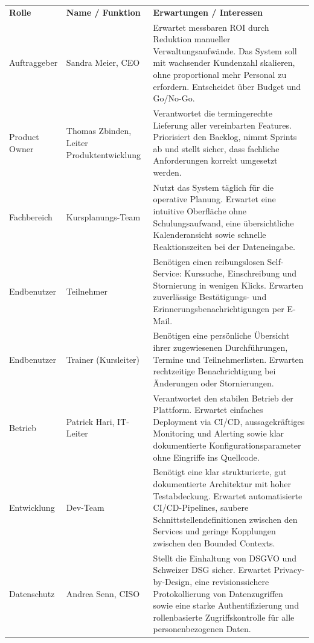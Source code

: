 \begin{tabularx}{\textwidth}{L{2.2cm} L{3.5cm} X}
  \color{white}\textbf{Rolle} & \color{white}\textbf{Name / Funktion} & \color{white}\textbf{Erwartungen / Interessen} \\
  Auftraggeber & Sandra Meier, CEO &
  Erwartet messbaren ROI durch Reduktion manueller Verwaltungsaufwände.
  Das System soll mit wachsender Kundenzahl skalieren, ohne proportional
  mehr Personal zu erfordern. Entscheidet über Budget und Go/No-Go. \\
  Product Owner & Thomas Zbinden, Leiter Produktentwicklung &
  Verantwortet die termingerechte Lieferung aller vereinbarten Features.
  Priorisiert den Backlog, nimmt Sprints ab und stellt sicher, dass
  fachliche Anforderungen korrekt umgesetzt werden. \\
  Fachbereich & Kursplanungs-Team &
  Nutzt das System täglich für die operative Planung. Erwartet eine
  intuitive Oberfläche ohne Schulungsaufwand, eine übersichtliche
  Kalenderansicht sowie schnelle Reaktionszeiten bei der Dateneingabe. \\
  Endbenutzer & Teilnehmer &
  Benötigen einen reibungslosen Self-Service: Kurssuche, Einschreibung
  und Stornierung in wenigen Klicks. Erwarten zuverlässige
  Bestätigungs- und Erinnerungsbenachrichtigungen per E-Mail. \\
  Endbenutzer & Trainer (Kursleiter) &
  Benötigen eine persönliche Übersicht ihrer zugewiesenen Durchführungen,
  Termine und Teilnehmerlisten. Erwarten rechtzeitige Benachrichtigung
  bei Änderungen oder Stornierungen. \\
  Betrieb & Patrick Hari, IT-Leiter &
  Verantwortet den stabilen Betrieb der Plattform. Erwartet einfaches
  Deployment via CI/CD, aussagekräftiges Monitoring und Alerting sowie
  klar dokumentierte Konfigurationsparameter ohne Eingriffe ins
  Quellcode. \\
  Entwicklung & Dev-Team &
  Benötigt eine klar strukturierte, gut dokumentierte Architektur mit
  hoher Testabdeckung. Erwartet automatisierte CI/CD-Pipelines, saubere
  Schnittstellendefinitionen zwischen den Services und geringe
  Kopplungen zwischen den Bounded Contexts. \\
  Datenschutz & Andrea Senn, CISO &
  Stellt die Einhaltung von DSGVO und Schweizer DSG sicher. Erwartet
  Privacy-by-Design, eine revisionssichere Protokollierung von
  Datenzugriffen sowie eine starke Authentifizierung und
  rollenbasierte Zugriffskontrolle für alle personenbezogenen Daten. \\
\end{tabularx}